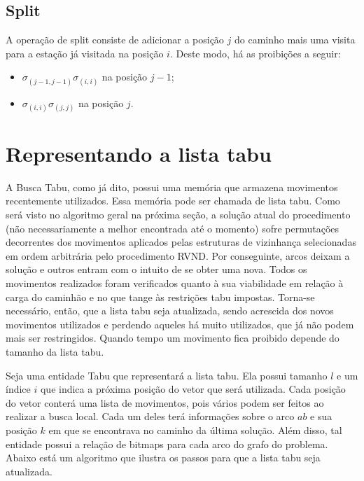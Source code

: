\subsection{Split}\label{sec:LABEL_CHP_5_SUBSEC_D}

\par A operação de split consiste de adicionar a posição $j$ do caminho mais uma visita para a estação já visitada na posição $i$. Deste modo, há as proibições a seguir:

	\begin{itemize}
        \item $\sigma_{(j-1, j-1)}\sigma_{(i, i)}$ na posição $j-1$;
        \item $\sigma_{(i, i)}\sigma_{(j, j)}$ na posição $j$.
    \end{itemize}
    
    
\section{Representando a lista tabu}\label{sec:LABEL_CHP_6_SEC_D}

\par A Busca Tabu, como já dito, possui uma memória que armazena movimentos recentemente utilizados. Essa memória pode ser chamada de lista tabu. Como será visto no algoritmo geral na próxima seção, a solução atual do procedimento (não necessariamente a melhor encontrada até o momento) sofre permutações decorrentes dos movimentos aplicados pelas estruturas de vizinhança selecionadas em ordem arbitrária pelo procedimento RVND. Por conseguinte, arcos deixam a solução e outros entram com o intuito de se obter uma nova. Todos os movimentos realizados foram verificados quanto à sua viabilidade em relação à carga do caminhão e no que tange às restrições tabu impostas. Torna-se necessário, então, que a lista tabu seja atualizada, sendo acrescida dos novos movimentos utilizados e perdendo aqueles há muito utilizados, que já não podem mais ser restringidos. Quando tempo um movimento fica proibido depende do tamanho da lista tabu.

\par Seja uma entidade Tabu que representará a lista tabu. Ela possui tamanho $l$ e um índice $i$ que indica a próxima posição do vetor que será utilizada. Cada posição do vetor conterá uma lista de movimentos, pois vários podem ser feitos ao realizar a busca local. Cada um deles terá informações sobre o arco $ab$ e sua posição $k$ em que se encontrava no caminho da última solução. Além disso, tal entidade possui a relação de bitmaps para cada arco do grafo do problema. Abaixo está um algoritmo que ilustra os passos para que a lista tabu seja atualizada.

